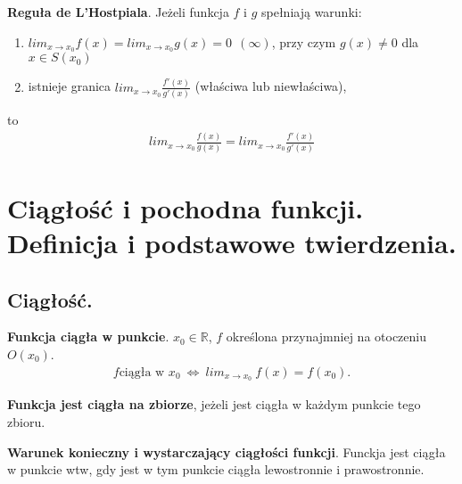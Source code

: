 \documentclass[main.tex]{subfiles}
\begin{document}
    \begin{theorem}
        \textbf{Reguła de L'Hostpiala}. Jeżeli funkcja $f$ i  $g$ spełniają warunki:
        \begin{enumerate}
            \item $lim_{x \rightarrow x_0} f(x) = lim_{x \rightarrow x_0} g(x) = 0 ~~ (\infty)$, przy czym $g(x) \neq 0$ dla $x \in S(x_0)$
            \item istnieje granica $lim_{x \rightarrow x_0} \frac{f'(x)}{g'(x)}$ (właściwa lub niewłaściwa),
        \end{enumerate}
        to
        \begin{align*}
            lim_{x \rightarrow x_0} \frac{f(x)}{g(x)} = lim_{x \rightarrow x_0} \frac{f'(x)}{g'(x)}
        \end{align*}
    \end{theorem}


    \section{Ciągłość i pochodna funkcji. Definicja i podstawowe twierdzenia.}

    \subsection{Ciągłość.}

    \begin{definition}
        \textbf{Funkcja ciągła w punkcie}. $x_0 \in \mathbb{R}$, $f$ określona przynajmniej na otoczeniu $O(x_0)$.
        \begin{align*}
            f \text{ciągła w }x_0 ~ \Leftrightarrow ~ lim_{x \rightarrow x_0} ~ f(x) = f(x_0).
        \end{align*}

        \textbf{Funkcja jest ciągła na zbiorze}, jeżeli jest ciągła w każdym punkcie tego zbioru.
    \end{definition}

    \begin{theorem}
        \textbf{Warunek konieczny i wystarczający ciągłości funkcji}. Funckja jest ciągła w punkcie wtw,
        gdy jest w tym punkcie ciągła lewostronnie i prawostronnie.
    \end{theorem}
\end{document}
